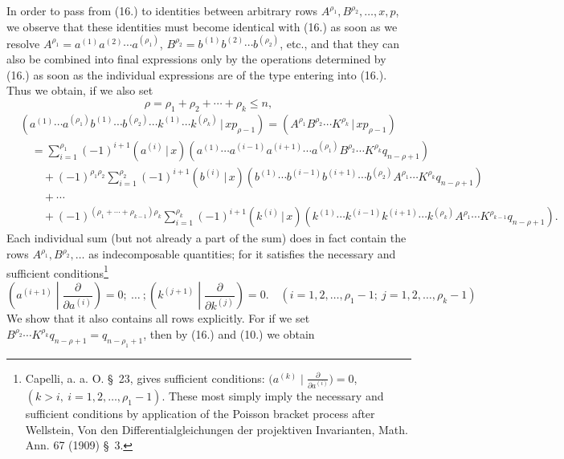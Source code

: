 \documentclass[11pt]{article}
\providecommand{\pair}[2]{(#1\,|\,#2)}
\begin{document}
In order to pass from (16.) to identities between arbitrary rows $A^{\rho_1},B^{\rho_2},\ldots,x,p$, we observe that these identities must become identical with (16.) as soon as we resolve
$A^{\rho_1}=a^{(1)}a^{(2)}\cdots a^{(\rho_1)}$, $B^{\rho_2}=b^{(1)}b^{(2)}\cdots b^{(\rho_2)}$, etc., and that they can also be combined into final expressions only by the operations determined by (16.) as soon as the individual expressions are of the type entering into (16.). Thus we obtain, if we also set
\begin{equation}
 \rho=\rho_1+\rho_2+\cdots+\rho_k\le n,
\tag{18}
\end{equation}
\begin{align*}
&\pair{a^{(1)}\cdots a^{(\rho_1)}b^{(1)}\cdots b^{(\rho_2)}\cdots k^{(1)}\cdots k^{(\rho_k)}}{xp_{\rho-1}}
  =\pair{A^{\rho_1}B^{\rho_2}\cdots K^{\rho_k}}{xp_{\rho-1}} \\
&\quad=\sum_{i=1}^{\rho_1}(-1)^{i+1}\pair{a^{(i)}}{x}(a^{(1)}\cdots a^{(i-1)}a^{(i+1)}\cdots a^{(\rho_1)}B^{\rho_2}\cdots K^{\rho_k}q_{n-\rho+1})\\
&\qquad+(-1)^{\rho_1\rho_2}\sum_{i=1}^{\rho_2}(-1)^{i+1}\pair{b^{(i)}}{x}(b^{(1)}\cdots b^{(i-1)}b^{(i+1)}\cdots b^{(\rho_2)}A^{\rho_1}\cdots K^{\rho_k}q_{n-\rho+1})\\
&\qquad+\cdots\\
&\qquad+(-1)^{(\rho_1+\cdots+\rho_{k-1})\rho_k}\sum_{i=1}^{\rho_k}(-1)^{i+1}\pair{k^{(i)}}{x}(k^{(1)}\cdots k^{(i-1)}k^{(i+1)}\cdots k^{(\rho_k)}A^{\rho_1}\cdots K^{\rho_{k-1}}q_{n-\rho+1}).
\end{align*}
Each individual sum (but not already a part of the sum) does in fact contain the rows $A^{\rho_1},B^{\rho_2},\ldots$ as indecomposable quantities; for it satisfies the necessary and sufficient conditions\footnote{Capelli, a. a. O. \S\ 23, gives sufficient conditions: $\bigl(a^{(k)}\mid \frac{\partial}{\partial a^{(i)}}\bigr)=0$, $(k>i,\ i=1,2,\ldots,\rho_1-1)$. These most simply imply the necessary and sufficient conditions by application of the Poisson bracket process after Wellstein, Von den Differentialgleichungen der projektiven Invarianten, Math. Ann. 67 (1909) \S\ 3.}
\begin{equation}
 \left(a^{(i+1)}\middle|\frac{\partial}{\partial a^{(i)}}\right)=0;\ \ldots\ ;
 \left(k^{(j+1)}\middle|\frac{\partial}{\partial k^{(j)}}\right)=0.
 \quad (i=1,2,\ldots,\rho_1-1;\ j=1,2,\ldots,\rho_k-1)
\tag{19}
\end{equation}
We show that it also contains all rows explicitly. For if we set $B^{\rho_2}\cdots K^{\rho_k}q_{n-\rho+1}=q_{n-\rho_1+1}$, then by (16.) and (10.) we obtain
\end{document}
